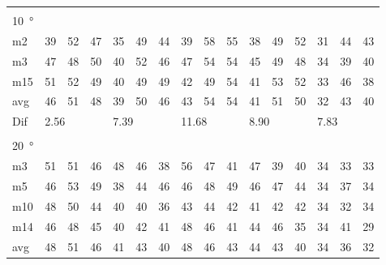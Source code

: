 \begin{table}[H]
\begin{tabular}{l|l|l|l|l|l|l|l|l|l|l|l|l|lll}
 \multicolumn{16}{l}{ } \\                             
\SI{10}{\degree}   & \multicolumn{3}{l|}{} & \multicolumn{3}{l|}{} & \multicolumn{3}{l|}{} & \multicolumn{3}{l|}{} & \multicolumn{3}{l}{}   \\  \hline
m2    &  39    &  52    &  47    &  35    &  49    &   44   &  39    &   58    &   55   &   38    &  49    &  52    & \multicolumn{1}{l|}{31} & \multicolumn{1}{l|}{44} & 43 \\
m3    &  47    &  48    &  50    &   40   &  52    &   46   &   47   &  54     &   54   &   45    & 49     &  48    & \multicolumn{1}{l|}{34} & \multicolumn{1}{l|}{39} & 40 \\
m15  &  51    &  52    &  49    &  40    & 49     &   49   &   42   &   49    &   54   &    41   &   53   &  52    & \multicolumn{1}{l|}{33} & \multicolumn{1}{l|}{46} &  38\\ \hline
avg &  46    & 51     & 48     & 39     &   50   & 46     &  43    &  54     &  54    &  41     & 51     & 50     & \multicolumn{1}{l|}{32} & \multicolumn{1}{l|}{43}  & 40 \\ \hline  
Dif & \multicolumn{3}{l|}{2.56} & \multicolumn{3}{l|}{7.39} & \multicolumn{3}{l|}{11.68} & \multicolumn{3}{l|}{8.90} & \multicolumn{3}{l}{7.83} \\     
\multicolumn{16}{l}{ } \\                
\SI{20}{\degree}   & \multicolumn{3}{l|}{} & \multicolumn{3}{l|}{} & \multicolumn{3}{l|}{} & \multicolumn{3}{l|}{} & \multicolumn{3}{l}{}   \\  \hline
m3    &  51    &  51    &  46    &  48    &  46    &  38    &   56   &    47   &  41    &  47     &  39    &  40    & \multicolumn{1}{l|}{34} & \multicolumn{1}{l|}{33} &33  \\
m5    &  46    &  53    &  49    &  38    &  44    & 46     &   46   &  48     &  49    &  46     &  47    &   44   & \multicolumn{1}{l|}{34} & \multicolumn{1}{l|}{37} &34  \\
m10  &  48    &  50    &  44    &  40    &   40   &   36   &   43   &   44    &   42   &  41     & 42     & 42     & \multicolumn{1}{l|}{34} & \multicolumn{1}{l|}{32} &34  \\
m14  &  46    &  48    &  45    &  40    &  42    &   41   &    48  &  46     &   41   &  44     &  46    &  35    & \multicolumn{1}{l|}{34} & \multicolumn{1}{l|}{41} & 29 \\ \hline
avg & 48     &  51    &  46    &   41   &  43    &  40    &  48    &   46    &  43    &  44     & 43     &  40    & \multicolumn{1}{l|}{34} & \multicolumn{1}{l|}{36}  & 32  \\ \hline  

\end{tabular}
\end{table}
